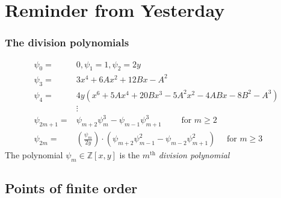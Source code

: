 \documentclass[10pt,handout]{beamer} %
\date{July 25, 2013}
\title[Elliptic curves over $\F_{q}$]{\insertlecture}
\subtitle{The group order}
\begin{document}
\begin{frame}
\titlepage
\end{frame}

\section{Reminder from Yesterday}


\begin{frame}\frametitle{The division polynomials}

\begin{Definition}[Division Polynomials of $E:y^2=x^3+Ax+B$ ($p>3$)]\vspace*{-0.7cm}
\begin{align*}
        \psi_{0} =& 0,
        \psi_{1} = 1,
        \psi_{2} = 2y\\
        \psi_{3} =& 3x^{4} + 6Ax^{2} + 12Bx - A^{2}\\
        \psi_{4} =& 4y(x^{6} + 5Ax^{4} + 20Bx^{3} - 5A^{2}x^{2} - 4ABx - 8B^{2} - A^{3}) \\
        &\vdots\\
        \psi_{2m+1} =& \psi_{m+2}\psi_{m}^{3}-\psi_{m-1}\psi^{3}_{m+1} \qquad \text{ for } m \geq 2\\
        \psi_{2m}  =& \left(\frac{\psi_{m}}{2y}\right)\cdot(\psi_{m+2}\psi^{2}_{m-1}-\psi_{m-2}\psi^{2}_{m+1}) \quad \text{ for } m \geq 3
\end{align*}
The polynomial $\psi_m\in{\mathbb Z}[x,y]$ is the $m^{\text{th}}$ \emph{division polynomial}
\end{Definition}\pause
{}
\end{frame}

\subsection{Points of finite order}
\end{document}
